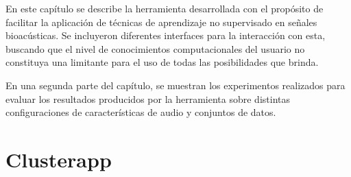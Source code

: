 En este capítulo se describe la herramienta desarrollada con el propósito de facilitar la aplicación de técnicas de aprendizaje no supervisado en señales bioacústicas.
Se incluyeron diferentes interfaces para la interacción con esta, buscando que el nivel de conocimientos computacionales del usuario no constituya una limitante para el uso de todas las posibilidades que brinda.

En una segunda parte del capítulo, se muestran los experimentos realizados para evaluar los resultados producidos por la herramienta sobre distintas configuraciones de características de audio y conjuntos de datos.

\section{Clusterapp}\label{sec:clusterapp}




